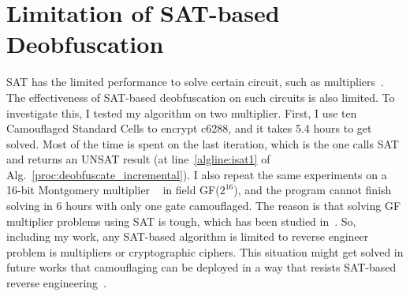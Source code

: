 \documentclass[thesis]{umassthesis}  %
\begin{document}
\section{Limitation of SAT-based Deobfuscation}

SAT has the limited performance to solve certain circuit, such as multipliers~\cite{cook1997finding}. The effectiveness of SAT-based deobfuscation on such circuits is also limited. To investigate this, I tested my algorithm on two multiplier. First, I use ten Camouflaged Standard Cells to encrypt c6288, and it takes 5.4 hours to get solved. Most of the time is spent on the last iteration, which is the one calls SAT and returns an UNSAT result (at line~\ref{algline:isat1} of Alg.~\ref{proc:deobfuscate_incremental}). I also repeat the same experiments on a 16-bit Montgomery multiplier ~\cite{koc1998montgomery} in field GF($2^{16}$), and the program cannot finish solving in 6 hours with only one gate camouflaged. The reason is that solving GF multiplier problems using SAT is tough, which has been studied in~\cite{lv2012efficient}.  So, including my work, any SAT-based algorithm is limited to reverse engineer problem is multipliers or cryptographic ciphers. This situation might get solved in future works that camouflaging can be deployed in a way that resists SAT-based reverse engineering~\cite{yasin-15}.

\end{document}
